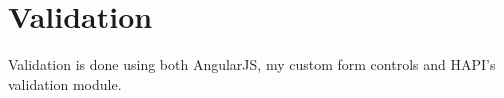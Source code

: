 \section{Validation}
Validation is done using both AngularJS, my custom form controls and HAPI's validation module.